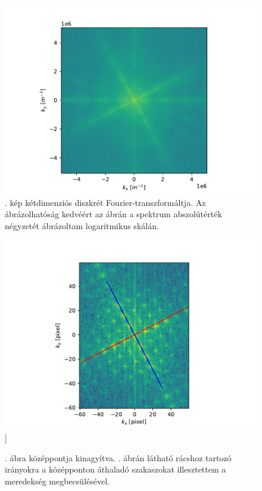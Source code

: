 \documentclass[pdftex,12pt,a4paper]{article}
\begin{document}
		
		\begin{figure}[H]
			\centering
			\includegraphics[scale=1]{./figs/2dfft.pdf}
			\caption{. kép kétdimenziós diszkrét Fourier-transzformáltja. Az ábrázolhatóság kedvéért az ábrán a spektrum abszolútérték négyzetét ábrázoltam logaritmikus skálán.}
			\label{2dfft}
		\end{figure}
		\begin{figure}[H]
			\centering
			\includegraphics[scale=1]{./figs/fftlines.pdf}]
			\caption{. ábra középpontja kinagyítva. . ábrán látható rácshoz tartozó irányokra a középponton áthaladó szakaszokat illesztettem a meredekség megbecsülésével.}
			\label{fftlines}
		\end{figure}
\end{document}
